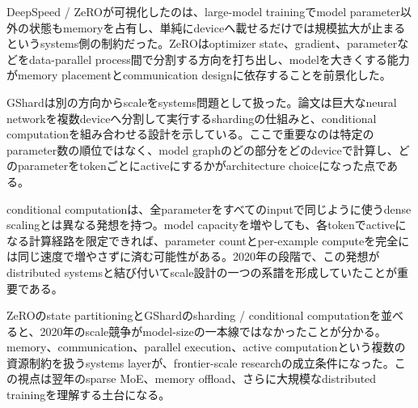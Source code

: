 DeepSpeed / ZeROが可視化したのは、large-model trainingでmodel parameter以外の状態もmemoryを占有し、単純にdeviceへ載せるだけでは規模拡大が止まるというsystems側の制約だった。ZeROはoptimizer state、gradient、parameterなどをdata-parallel process間で分割する方向を打ち出し、modelを大きくする能力がmemory placementとcommunication designに依存することを前景化した。\autocite{src-f1047e7f654c}


GShardは別の方向からscaleをsystems問題として扱った。論文は巨大なneural networkを複数deviceへ分割して実行するshardingの仕組みと、conditional computationを組み合わせる設計を示している。ここで重要なのは特定のparameter数の順位ではなく、model graphのどの部分をどのdeviceで計算し、どのparameterをtokenごとにactiveにするかがarchitecture choiceになった点である。\autocite{src-56ccf2fa5ce7}


conditional computationは、全parameterをすべてのinputで同じように使うdense scalingとは異なる発想を持つ。model capacityを増やしても、各tokenでactiveになる計算経路を限定できれば、parameter countとper-example computeを完全には同じ速度で増やさずに済む可能性がある。2020年の段階で、この発想がdistributed systemsと結び付いてscale設計の一つの系譜を形成していたことが重要である。\autocite{src-56ccf2fa5ce7}


ZeROのstate partitioningとGShardのsharding / conditional computationを並べると、2020年のscale競争がmodel-sizeの一本線ではなかったことが分かる。memory、communication、parallel execution、active computationという複数の資源制約を扱うsystems layerが、frontier-scale researchの成立条件になった。この視点は翌年のsparse MoE、memory offload、さらに大規模なdistributed trainingを理解する土台になる。\autocite{src-56ccf2fa5ce7,src-f1047e7f654c}


